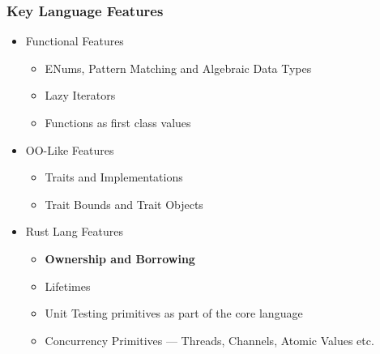 \begin{frame}
  \frametitle{Key Language Features}
  \begin{itemize}
  \item Functional Features
    \begin{itemize}
    \item ENums, Pattern Matching and Algebraic Data Types
    \item Lazy Iterators
    \item Functions as first class values
    \end{itemize}
  \item OO-Like Features
    \begin{itemize}
    \item Traits and Implementations
    \item Trait Bounds and Trait Objects
    \end{itemize}
  \item Rust Lang Features
    \begin{itemize}
    \item \textbf{Ownership and Borrowing}
    \item Lifetimes
    \item Unit Testing primitives as part of the core language
    \item Concurrency Primitives --- Threads, Channels, Atomic Values etc.
    \end{itemize}
  \end{itemize}
\end{frame}
